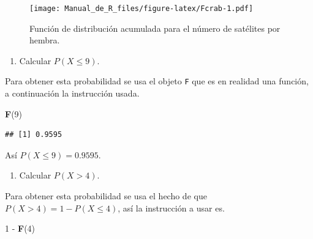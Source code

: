 \documentclass[10pt,]{krantz}
\makeatletter
\newenvironment{Shaded}{\begin{snugshade}}{\end{snugshade}}
\newcommand{\KeywordTok}[1]{\textcolor[rgb]{0.13,0.29,0.53}{\textbf{{#1}}}}
\newcommand{\DataTypeTok}[1]{\textcolor[rgb]{0.13,0.29,0.53}{{#1}}}
\newcommand{\DecValTok}[1]{\textcolor[rgb]{0.00,0.00,0.81}{{#1}}}
\newcommand{\StringTok}[1]{\textcolor[rgb]{0.31,0.60,0.02}{{#1}}}
\newcommand{\NormalTok}[1]{{#1}}
\providecommand{\tightlist}{%
  \setlength{\itemsep}{0pt}\setlength{\parskip}{0pt}}
\newenvironment{kframe}{%
\medskip{}
\setlength{\fboxsep}{.8em}
 \def\at@end@of@kframe{}%
 \ifinner\ifhmode%
  \def\at@end@of@kframe{\end{minipage}}%
  \begin{minipage}{\columnwidth}%
 \fi\fi%
 \def\FrameCommand##1{\hskip\@totalleftmargin \hskip-\fboxsep
 \colorbox{shadecolor}{##1}\hskip-\fboxsep
     \hskip-\linewidth \hskip-\@totalleftmargin \hskip\columnwidth}%
 \MakeFramed {\advance\hsize-\width
   \@totalleftmargin\z@ \linewidth\hsize
   \@setminipage}}%
 {\par\unskip\endMakeFramed%
 \at@end@of@kframe}
\renewenvironment{Shaded}{\begin{kframe}}{\end{kframe}}
\makeatother
\begin{document}
\begin{Shaded}
\end{Shaded}

\begin{figure}[htbp]
\centering
\texttt{[image: Manual\_de\_R\_files/figure-latex/Fcrab-1.pdf]}
\caption{\label{fig:Fcrab}Función de distribución acumulada para el número
de satélites por hembra.}
\end{figure}

\begin{enumerate}
\def\labelenumi{\arabic{enumi})}
\setcounter{enumi}{2}
\tightlist
\item
  Calcular \(P(X \leq 9)\).
\end{enumerate}

Para obtener esta probabilidad se usa el objeto \texttt{F} que es en
realidad una función, a continuación la instrucción usada.

\begin{Shaded}
\begin{Highlighting}[]
\KeywordTok{F}\NormalTok{(}\DecValTok{9}\NormalTok{)}
\end{Highlighting}
\end{Shaded}

\begin{verbatim}
## [1] 0.9595
\end{verbatim}

Así \(P(X \leq 9)=0.9595\).

\begin{enumerate}
\def\labelenumi{\arabic{enumi})}
\setcounter{enumi}{3}
\tightlist
\item
  Calcular \(P(X > 4)\).
\end{enumerate}

Para obtener esta probabilidad se usa el hecho de que
\(P(X > 4) = 1 - P(X \leq 4)\), así la instrucción a usar es.

\begin{Shaded}
\begin{Highlighting}[]
\DecValTok{1} \NormalTok{-}\StringTok{ }\KeywordTok{F}\NormalTok{(}\DecValTok{4}\NormalTok{)}
\end{Highlighting}
\end{Shaded}
\end{document}
